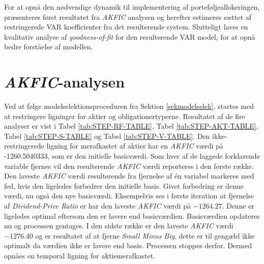 \documentclass[
  a4paper,
  oneside]{memoir}
\begin{document}
For at opnå den nødvendige dynamik til implementering af porteføljeallokeringen, præsenteres først resultatet fra \emph{AKFIC} analysen og herefter estimeres sættet af restringerede VAR koefficienter fra det resulterende system. Slutteligt laves en kvalitativ analyse af \emph{goodness-of-fit} for den resulterende VAR model, for at opnå bedre forståelse af modellen.

\hypertarget{akficana}{%
\section{\texorpdfstring{\emph{AKFIC}-analysen}{AKFIC-analysen}}\label{akficana}}

Ved at følge modelselektionsproceduren fra Sektion \ref{sekmodelselek}, startes med at restringere ligninger for aktier og obligationertyperne. Resultatet af de fire analyser er vist i Tabel \ref{tab:STEP-RF-TABLE}, Tabel \ref{tab:STEP-AKT-TABLE}, Tabel \ref{tab:STEP-S-TABLE} og Tabel \ref{tab:STEP-V-TABLE}. Den ikke-restringerede ligning for merafkastet af aktier har en \emph{AKFIC} værdi på -1260.5040333, som er den initielle basisværdi. Som hver af de laggede forklarende variable fjernes vil den resulterende \emph{AKFIC} værdi reporteres i den første række. Den laveste \emph{AKFIC} værdi resulterende fra fjernelse af én variabel markeres med fed, hvis den ligeledes forbedrer den initielle basis. Givet forbedring er denne værdi, nu også den nye basisværdi. Eksempelvis ses i første iteration at fjernelse af \emph{Dividend-Price Ratio} er har den laveste \emph{AKFIC} værdi på \(-1264.27\). Denne er ligeledes optimal eftersom den er lavere end basisværdien. Basisværdien opdateres nu og processen gentages. I den sidste række er den laveste \emph{AKFIC} værdi \(-1276.40\) og er resultatet af at fjerne \emph{Small Minus Big}, dette er til gengæld ikke optimalt da værdien ikke er lavere end basis. Processen stoppes derfor. Dermed opnåes en temporal ligning for aktiemerafkastet.
\end{document}
